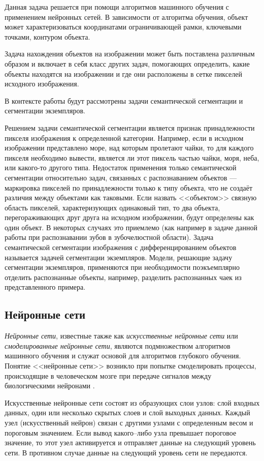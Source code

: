 Данная задача решается при помощи алгоритмов машинного обучения с применением нейронных сетей. В зависимости от алгоритма обучения, объект может характеризоваться координатами ограничивающей рамки, ключевыми точками, контуром объекта.

Задача нахождения объектов на изображении может быть поставлена различным образом и включает в себя класс других задач, помогающих определить, какие объекты находятся на изображении и где они расположены в сетке пикселей исходного изображения.

В контексте работы будут рассмотрены задачи семантической сегментации и сегментации 
экземпляров.

Решением задачи семантической сегментации является признак принадлежности пикселя изображения к определенной категории. Например, если в исходном изображении представлено море, над которым пролетают чайки, то для каждого пикселя необходимо вывести, является ли этот пиксель частью чайки, моря, неба, или какого-то другого типа. Недостаток применения только семантической сегментации относительно задач, связанных с распознаванием объектов --- маркировка пикселей по принадлежности только к типу объекта, что не создаёт различия между объектами как таковыми. Если назвать <<объектом>> связную область пикселей, характеризующих одинаковый тип, то два объекта, перегораживающих друг друга на исходном изображении, будут определены как один объект. В некоторых случаях это приемлемо (как например в задаче данной работы при распознавании зубов в зубочелюстной области). Задача семантической сегментации изображения с дифференцированием объектов называется задачей сегментации экземпляров. Модели, решающие задачу сегментации экземпляров, применяются при необходимости поэкъемплярно отделить распознанные объекты, например, разделить распознанных чаек из представленного примера.

\subsection{Нейронные сети}
\textit{Нейронные сети}, известные также как \textit{искусственные нейронные сети} или \textit{смоделированные нейронные сети}, являются подмножеством алгоритмов машинного обучения и служат основой для алгоритмов глубокого обучения. Понятие <<нейронные сети>> возникло при попытке смоделировать процессы, происходящие в человеческом мозге при передаче сигналов между биологическими нейронами \cite{neuralnet}.

Искусственные нейронные сети состоят из образующих слои узлов: слой входных данных, один или несколько скрытых слоев и слой выходных данных. Каждый узел (искусственный нейрон) связан с другими узлами с определенным весом и пороговым значением. Если вывод какого--либо узла превышает пороговое значение, то этот узел активируется и отправляет данные на следующий уровень сети. В противном случае данные на следующий уровень сети не передаются.

